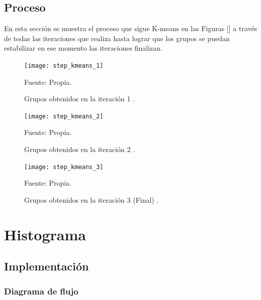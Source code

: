 \subsection{Proceso}

En esta sección se muestra el proceso que sigue K-means en las Figuras [] a través de todas las iteraciones que realiza hasta lograr que los grupos se puedan estabilizar en ese momento las iteraciones finalizan.

\begin{figure}[ht]
	\begin{center}
		\texttt{[image: step\_kmeans\_1]}
	\end{center}
	\begin{center}
		\vskip -0.5cm
		\caption{\small{Grupos obtenidos en la iteración 1 .}}
		{\small{Fuente: Propia. }}
	\end{center}
\end{figure}

\begin{figure}[ht]
	\begin{center}
		\texttt{[image: step\_kmeans\_2]}
	\end{center}
	\begin{center}
		\vskip -0.5cm
		\caption{\small{Grupos obtenidos en la iteración 2 .}}
		{\small{Fuente: Propia. }}
	\end{center}
\end{figure}

\begin{figure}[ht]
	\begin{center}
		\texttt{[image: step\_kmeans\_3]}
	\end{center}
	\begin{center}
		\vskip -0.5cm
		\caption{\small{Grupos obtenidos en la iteración 3 (Final) .}}
		{\small{Fuente: Propia. }}
	\end{center}
\end{figure}


\section{Histograma}

\subsection{Implementación}

\subsubsection{Diagrama de flujo}

